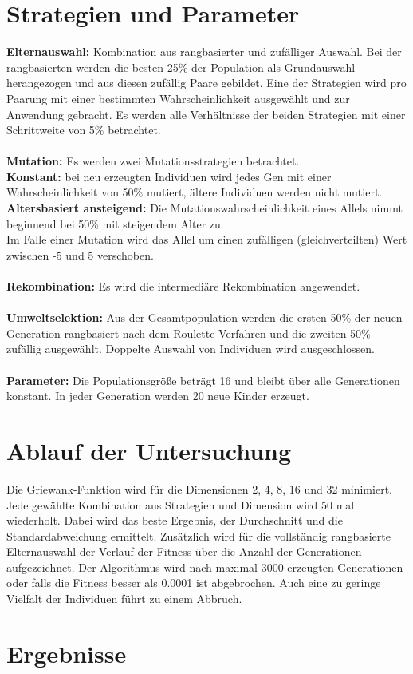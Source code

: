 \documentclass[12pt,
    a4paper,
    headinclude,
    footinclude]{scrartcl}
\begin{document}
	\section{Strategien und Parameter}

	\textbf{Elternauswahl:} Kombination aus rangbasierter und zufälliger Auswahl. Bei der rangbasierten werden die besten 25\% der Population als Grundauswahl herangezogen und aus diesen zufällig Paare gebildet.
	Eine der Strategien wird pro Paarung mit einer bestimmten Wahrscheinlichkeit ausgewählt und zur Anwendung gebracht. Es werden alle Verhältnisse der beiden Strategien mit einer Schrittweite von 5\% betrachtet. \\\\	
	\textbf{Mutation:} Es werden zwei Mutationsstrategien betrachtet. \\
	\textbf{Konstant:} bei neu erzeugten Individuen wird jedes Gen mit einer Wahrscheinlichkeit von 50\% mutiert, ältere Individuen werden nicht mutiert.
	\textbf{Altersbasiert ansteigend:} Die Mutationswahrscheinlichkeit eines Allels nimmt beginnend bei 50\% mit steigendem Alter zu.\\
	Im Falle einer Mutation wird das Allel um einen zufälligen (gleichverteilten) Wert zwischen -5 und 5 verschoben. \\\\
	\textbf{Rekombination:} Es wird die intermediäre Rekombination angewendet.\\\\
	\textbf{Umweltselektion:} Aus der Gesamtpopulation werden die ersten 50\% der neuen Generation rangbasiert nach dem Roulette-Verfahren und die zweiten 50\% zufällig ausgewählt. Doppelte Auswahl von Individuen wird ausgeschlossen.\\\\
	\textbf{Parameter:} Die Populationsgröße beträgt 16 und bleibt über alle Generationen konstant. In jeder Generation werden 20 neue Kinder erzeugt.
	
	\section{Ablauf der Untersuchung}
	Die Griewank-Funktion wird für die Dimensionen 2, 4, 8, 16 und 32 minimiert. Jede gewählte Kombination aus Strategien und Dimension wird 50 mal wiederholt. Dabei wird das beste Ergebnis, der Durchschnitt und die Standardabweichung ermittelt. Zusätzlich wird für die vollständig rangbasierte Elternauswahl der Verlauf der Fitness über die Anzahl der Generationen aufgezeichnet. Der Algorithmus wird nach maximal 3000 erzeugten Generationen oder falls die Fitness besser als 0.0001 ist abgebrochen. Auch eine zu geringe Vielfalt der Individuen führt zu einem Abbruch.

	\section{Ergebnisse}
	\blindtext[5]
\end{document}
